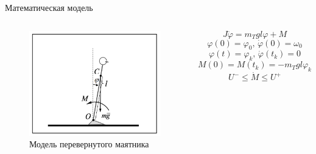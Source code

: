 \documentclass[10pt]{beamer}
\begin{document}
\begin{frame}{Математическая модель}
	\begin{columns}
		\begin{figure}[h!]
			\includegraphics[width=1\linewidth]{images/inverse_pendulum.png}
			\caption{Модель перевернутого маятника}
		\end{figure}

		\[
			J\ddot{\varphi}=m_Tgl\varphi+M
		\]
		\[
			\varphi(0)=\varphi_0,\, \dot{\varphi}(0)=\omega_0
		\]
		\[
			\varphi(t)=\varphi_k,\, \dot{\varphi}(t_k)=0
		\]
		\[
			M(0)=M(t_k)=-m_Tgl\varphi_k
		\]
		\[
			U^-\leq\dot{M}\leq U^+
		\]
	\end{columns}
\end{frame}
\end{document}

